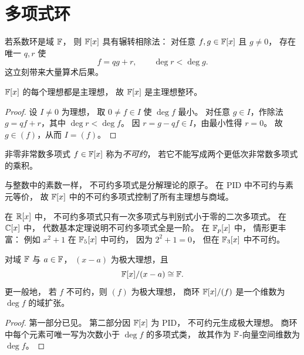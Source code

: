 \section{多项式环}
若系数环是域 $\mathbb{F}$， 则 $\mathbb{F}[x]$ 具有辗转相除法： 对任意 $f,g\in \mathbb{F}[x]$ 且 $g\ne 0$， 存在唯一 $q,r$ 使
\[
f=qg+r,
\qquad
\deg r<\deg g.
\]
这立刻带来大量算术后果。
\begin{proposition}
$\mathbb{F}[x]$ 的每个理想都是主理想， 故 $\mathbb{F}[x]$ 是主理想整环。
\end{proposition}
\begin{proof}
设 $I\ne 0$ 为理想， 取 $0\ne f\in I$ 使 $\deg f$ 最小。 对任意 $g\in I$，作除法 $g=qf+r$，其中 $\deg r<\deg f$。 因 $r=g-qf\in I$，由最小性得 $r=0$。 故 $g\in (f)$，从而 $I=(f)$。
\end{proof}
\begin{definition}
非零非常数多项式 $f\in \mathbb{F}[x]$ 称为\emph{不可约}， 若它不能写成两个更低次非常数多项式的乘积。
\end{definition}
与整数中的素数一样， 不可约多项式是分解理论的原子。 在 PID 中不可约与素元等价， 故 $\mathbb{F}[x]$ 中的不可约多项式控制了所有主理想与商域。
\begin{example}
在 $\mathbb{R}[x]$ 中， 不可约多项式只有一次多项式与判别式小于零的二次多项式。 在 $\mathbb{C}[x]$ 中， 代数基本定理说明不可约多项式全是一阶。 在 $\mathbb{F}_p[x]$ 中， 情形更丰富： 例如 $x^2+1$ 在 $\mathbb{F}_5[x]$ 中可约， 因为 $2^2+1=0$， 但在 $\mathbb{F}_3[x]$ 中不可约。
\end{example}
\begin{proposition}
对域 $\mathbb{F}$ 与 $a\in \mathbb{F}$， $(x-a)$ 为极大理想，且
\[
\mathbb{F}[x]/(x-a)\cong \mathbb{F}.
\]
更一般地， 若 $f$ 不可约，则 $(f)$ 为极大理想， 商环 $\mathbb{F}[x]/(f)$ 是一个维数为 $\deg f$ 的域扩张。
\end{proposition}
\begin{proof}
第一部分已见。 第二部分因 $\mathbb{F}[x]$ 为 PID， 不可约元生成极大理想。 商环中每个元素可唯一写为次数小于 $\deg f$ 的多项式类， 故其作为 $\mathbb{F}$-向量空间维数为 $\deg f$。
\end{proof}
